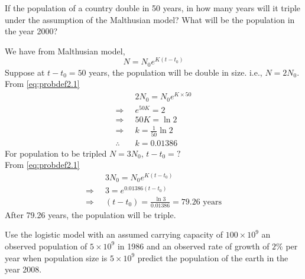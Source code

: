 \documentclass[../main-sheet.tex]{subfiles}
\begin{document}
\begin{soln}
\begin{center}
    \end{center}
\end{soln}
\begin{prob}
    If the population of a country double in 50 years, in how many years will it triple under the assumption of the Malthusian model? What will be the population in the year 2000?
\end{prob}
\begin{soln}
    We have from Malthusian model,
    \begin{equation}
        N=N_0e^{K(t-t_0)}\label{eq:probdef2.1}
    \end{equation}
    Suppose at \(t-t_0=50\) years, the population will be double in size. i.e., \(N=2N_0\).\\
    From \eqref{eq:probdef2.1} 
    \begin{align*}
        &2N_0=N_0 e^{K\times 50}\\
        \Rightarrow\;\;& e^{50K}=2\\
        \Rightarrow\;\;& {50K}=\ln 2\\
        \Rightarrow\;\;& k=\frac{1}{50}\ln 2\\
        \therefore\;\;& k=0.01386
    \end{align*}
    For population to be tripled \(N=3N_0\), \(t-t_0=?\)\\
    From \eqref{eq:probdef2.1} 
    \begin{align*}
        &3N_0=N_0 e^{K(t-t_0)}\\
        \Rightarrow\;\;&3= e^{0.01386(t-t_0)}\\
        \Rightarrow\;\;& (t-t_0)=\frac{\ln 3}{0.01386}=79.26\text{ years}
    \end{align*}
    After 79.26 years, the population will be triple.
\end{soln}
\begin{prob}
    Use the logistic model with an assumed carrying capacity of \(100\times 10^9\) an observed population of \(5\times 10^9\) in 1986 and an observed rate of growth of \(2\%\) per year when population size is \(5 \times 10^9\) predict the population of the earth in the year 2008.
\end{prob}
\end{document}
